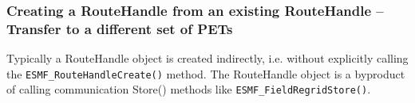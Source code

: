  
\setlength{\oldparskip}{\parskip}
\setlength{\parskip}{1.5ex}
\setlength{\oldparindent}{\parindent}
\setlength{\parindent}{0pt}
\setlength{\oldbaselineskip}{\baselineskip}
\setlength{\baselineskip}{11pt}
 
\def\bv{\begin{verbatim}}
\def\ev{\end{verbatim}}
\def\be{\begin{equation}}
\def\ee{\end{equation}}
\def\bea{\begin{eqnarray}}
\def\eea{\end{eqnarray}}
\def\bi{\begin{itemize}}
\def\ei{\end{itemize}}
\def\bn{\begin{enumerate}}
\def\en{\end{enumerate}}
\def\bd{\begin{description}}
\def\ed{\end{description}}
\def\({\left (}
\def\){\right )}
\def\[{\left [}
\def\]{\right ]}
\def\<{\left  \langle}
\def\>{\right \rangle}
\def\cI{{\cal I}}
\def\diag{\mathop{\rm diag}}
\def\tr{\mathop{\rm tr}}


 

   \subsubsection{Creating a RouteHandle from an existing RouteHandle -- 
   Transfer to a different set of PETs}
   \label{RH:RHfromRH}
  
   \begin{sloppypar}
   Typically a RouteHandle object is created indirectly, i.e. without explicitly
   calling the {\tt ESMF\_RouteHandleCreate()} method. The RouteHandle
   object is a byproduct of calling communication Store() methods like 
   {\tt ESMF\_FieldRegridStore()}. 
   \end{sloppypar}
  
